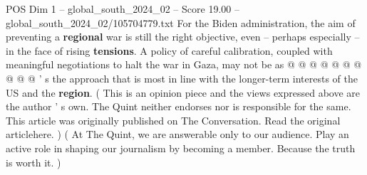 \begin{textsample}{POS Dim 1 – global\_south\_2024\_02 – Score 19.00 – global\_south\_2024\_02/105704779.txt}
For the Biden administration, the aim of preventing a \textbf{regional} war is still the right objective, even -- perhaps especially -- in the face of rising \textbf{tensions}.
A policy of careful calibration, coupled with meaningful negotiations to halt the war in Gaza, may not be as @ @ @ @ @ @ @ @ @ @ ' s the approach that is most in line with the longer-term interests of the US and the \textbf{region}. ( This is an opinion piece and the views expressed above are the author ' s own.
The Quint neither endorses nor is responsible for the same.
This article was originally published on The Conversation.
Read the original articlehere. ) ( At The Quint, we are answerable only to our audience.
Play an active role in shaping our journalism by becoming a member.
Because the truth is worth it. )

\end{textsample}
